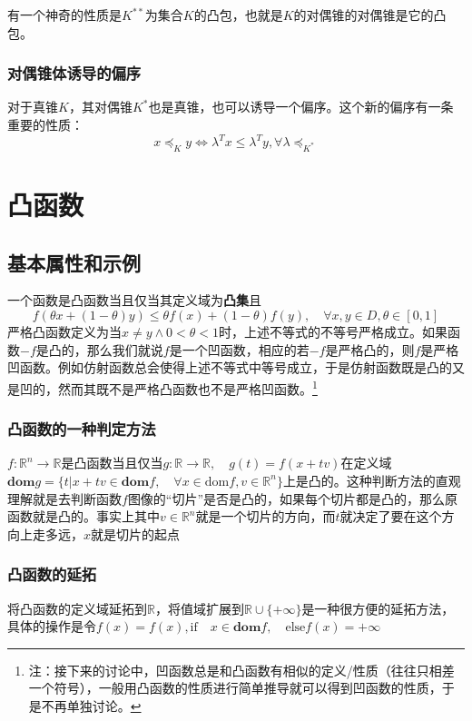 \documentclass[12pt,a4paper]{book}
\begin{document}
有一个神奇的性质是$K^{**}$为集合$K$的凸包，也就是$K$的对偶锥的对偶锥是它的凸包。

\subsection{对偶锥体诱导的偏序}

对于真锥$K$，其对偶锥$K^*$也是真锥，也可以诱导一个偏序。这个新的偏序有一条重要的性质：
$$x\preceq_K y \Leftrightarrow \lambda^T x \leq \lambda^T y,\forall \lambda\preceq_{K^*}$$

\chapter{凸函数}

\section{基本属性和示例}

一个函数是凸函数当且仅当其定义域为\textbf{凸集}且
$$f(\theta x +(1-\theta)y)\leq \theta f(x) + (1-\theta)f(y),\quad \forall x,y\in D, \theta\in [0,1]$$
严格凸函数定义为当$x\neq y\land 0<\theta<1$时，上述不等式的不等号严格成立。如果函数$-f$是凸的，那么我们就说$f$是一个凹函数，相应的若$-f$是严格凸的，则$f$是严格凹函数。例如仿射函数总会使得上述不等式中等号成立，于是仿射函数既是凸的又是凹的，然而其既不是严格凸函数也不是严格凹函数。\footnote{注：接下来的讨论中，凹函数总是和凸函数有相似的定义/性质（往往只相差一个符号），一般用凸函数的性质进行简单推导就可以得到凹函数的性质，于是不再单独讨论。}

\subsection{凸函数的一种判定方法}

$f:\mathbb{R}^n\to\mathbb{R}$是凸函数当且仅当$g:\mathbb{R}\to\mathbb{R},\quad g(t)=f(x+tv)$在定义域$\textbf{dom} g=\{t|x+tv\in \textbf{dom} f,\quad \forall x\in \text{dom}f,v\in\mathbb{R}^n\}$上是凸的。这种判断方法的直观理解就是去判断函数$f$图像的“切片”是否是凸的，如果每个切片都是凸的，那么原函数就是凸的。事实上其中$v\in\mathbb{R}^n$就是一个切片的方向，而$t$就决定了要在这个方向上走多远，$x$就是切片的起点

\subsection{凸函数的延拓}

将凸函数的定义域延拓到$\mathbb{R}$，将值域扩展到$\mathbb{R}\cup \{+\infty\} $是一种很方便的延拓方法，具体的操作是令$f(x)=f(x) ,\text{if}\quad x \in \textbf{dom}f ,\quad\text{else} f(x) = +\infty$
\end{document}
